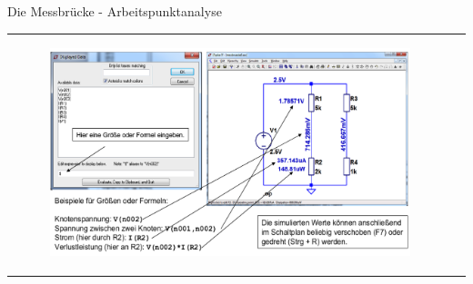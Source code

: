 \begin{frame}[t]{Die Messbrücke - Arbeitspunktanalyse}
\begin{spacing}{0.9}
\begin{tiny}
\begin{table}[h!]
\begin{tabular}{p{3cm} p{7cm}}
\begin{minipage}{.7\textwidth}
\begin{figure}
            \centering
            \includegraphics[width=0.8\linewidth]{pictures/manipulation.png}
          \end{figure}
       \end{minipage} 
       \\
        \end{tabular}
      \end{table}
    \end{tiny} \end{spacing}
    
  
       \end{frame}

